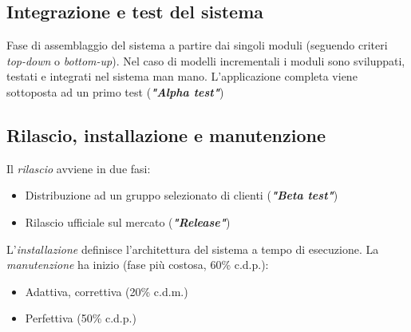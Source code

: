 \subsection{Integrazione e test del sistema}
Fase di assemblaggio del sistema a partire dai singoli moduli (seguendo criteri \textit{top-down} o \textit{bottom-up}). Nel caso di modelli incrementali i moduli sono sviluppati, testati e integrati nel sistema man mano. L'applicazione completa viene sottoposta ad un primo test (\textbf{\textit{"Alpha test"}})

\subsection{Rilascio, installazione e manutenzione}
Il \textit{rilascio} avviene in due fasi:
\begin{itemize}
    \item Distribuzione ad un gruppo selezionato di clienti (\textbf{\textit{"Beta test"}})
    \item Rilascio ufficiale sul mercato (\textit{\textbf{"Release"}})
\end{itemize}
L'\textit{installazione} definisce l'architettura del sistema a tempo di esecuzione.
La \textit{manutenzione} ha inizio (fase più costosa, 60\% c.d.p.):
\begin{itemize}
    \item Adattiva, correttiva (20\% c.d.m.)
    \item Perfettiva (50\% c.d.p.)
\end{itemize}

\newpage